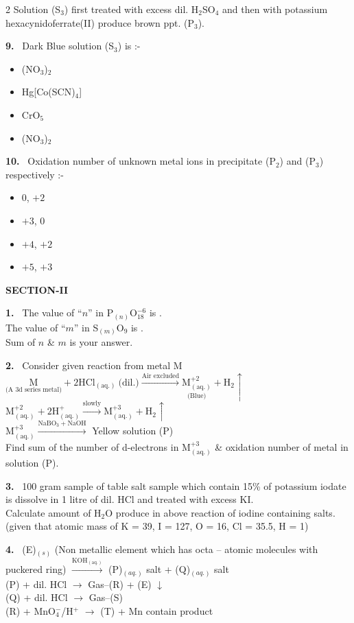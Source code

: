 \documentclass[10pt]{extarticle}
\newcommand{\sect}[1]{\par\smallskip\noindent\textbf{#1}\par}
\newcommand{\qn}[1]{\par\smallskip\noindent\textbf{#1.}~}
\newenvironment{qoptions}{\begin{itemize}[leftmargin=1.8em,itemsep=1pt,topsep=2pt,label={}]}{\end{itemize}}
\newcommand{\opt}[2]{\item[(#1)] #2}
\begin{document}
\begin{multicols}{2}
Solution (S$_3$) first treated with excess dil. H$_2$SO$_4$ and then with potassium hexacynidoferrate(II) produce brown ppt. (P$_3$).
\qn{9} Dark Blue solution (S$_3$) is :-
\begin{qoptions}
\opt{A}{[Ni(NH$_3$)$_6$](NO$_3$)$_2$}
\opt{B}{Hg[Co(SCN)$_4$]}
\opt{C}{CrO$_5$}
\opt{D}{[Cu(NH$_3$)$_4$](NO$_3$)$_2$}
\end{qoptions}
\qn{10} Oxidation number of unknown metal ions in precipitate (P$_2$) and (P$_3$) respectively :-
\begin{qoptions}
\opt{A}{0, $+2$}
\opt{B}{$+3$, 0}
\opt{C}{$+4$, $+2$}
\opt{D}{$+5$, $+3$}
\end{qoptions}
\sect{SECTION-II}
\qn{1} The value of ``$n$'' in P$_{(n)}$O$_{18}^{-6}$ is \underline{\hspace{1cm}}.\\
The value of ``$m$'' in S$_{(m)}$O$_9$ is \underline{\hspace{1cm}}.\\
Sum of $n$ \& $m$ is your answer.
\qn{2} Consider given reaction from metal M\\
$\underset{\text{(A 3d series metal)}}{\mathrm{M}}+2\mathrm{HCl_{(aq.)}}\ \text{(dil.)}\xrightarrow{\text{Air excluded}}\underset{\text{(Blue)}}{\mathrm{M^{+2}_{(aq.)}}}+\mathrm{H_2}\uparrow$\\
$\mathrm{M^{+2}_{(aq.)}}+2\mathrm{H^+_{(aq.)}}\xrightarrow{\text{slowly}}\mathrm{M^{+3}_{(aq.)}}+\mathrm{H_2}\uparrow$\\
$\mathrm{M^{+3}_{(aq.)}}\xrightarrow{\mathrm{NaBO_3+NaOH}}$ Yellow solution (P)\\
Find sum of the number of d-electrons in $\mathrm{M^{+3}_{(aq.)}}$ \& oxidation number of metal in solution (P).
\qn{3} 100 gram sample of table salt sample which contain 15\% of potassium iodate is dissolve in 1 litre of dil. HCl and treated with excess KI.\\
Calculate amount of H$_2$O produce in above reaction of iodine containing salts.\\
(given that atomic mass of K = 39, I = 127, O = 16, Cl = 35.5, H = 1)
\qn{4} (E)$_{(s)}$ (Non metallic element which has octa -- atomic molecules with puckered ring) $\xrightarrow{\mathrm{KOH_{(aq.)}}}$ (P)$_{(aq.)}$ salt + (Q)$_{(aq.)}$ salt\\
(P) + dil. HCl $\to$ Gas--(R) + (E) $\downarrow$\\
(Q) + dil. HCl $\to$ Gas--(S)\\
(R) + MnO$_4^-$/H$^+$ $\to$ (T) + Mn contain product\\

\end{multicols}
\end{document}
